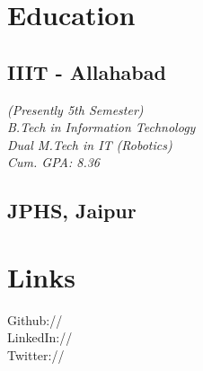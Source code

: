 \documentclass[]{deedy-resume-openfont}
\begin{document}
%
%
\lastupdated

%
%




%
%

\begin{minipage}[t]{0.33\textwidth} 


\section{Education} 

\subsection{IIIT - Allahabad}
\textit{(Presently 5th Semester)\\B.Tech in Information Technology\\ Dual M.Tech in IT (Robotics) \\ Cum. GPA: 8.36}
\sectionsep

\subsection{JPHS, Jaipur}
\sectionsep


\section{Links} 
Github:// \href{https://github.com/Ellusionists}{} \\
LinkedIn://  \href{https://www.linkedin.com/in/aditya-goel-11a578134/}{} \\
Twitter://  \href{https://twitter.com/itsAdityaGoel}{} \\
\sectionsep


\end{minipage}
\end{document}
